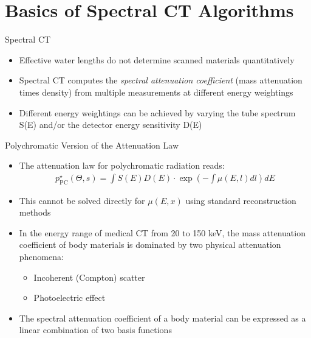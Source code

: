 \section{Basics of Spectral CT Algorithms}

\begin{frame} [c]{Spectral CT}
    \begin{itemize}
        \setlength\itemsep{0.4cm}
        \item Effective water lengths do not determine scanned materials quantitatively
        \item Spectral CT computes the \textit{spectral attenuation coefficient} (mass attenuation times density) from multiple measurements at different energy weightings
        \item Different energy weightings can be achieved by varying the tube spectrum S(E) and/or the detector energy sensitivity D(E)
    \end{itemize}
\end{frame}

\begin{frame}[c]{Polychromatic Version of the Attenuation Law}
    \begin{itemize}
        \item The attenuation law for polychromatic radiation reads:
              \begin{eqnarray*}
                  p^{\star}_{\text{PC}}(\Theta,s) = \int S(E)D(E) \cdot \exp\left(-\int \mu(E, l)dl\right)dE
              \end{eqnarray*}
        \item This cannot be solved directly for $\mu(E,x)$ using standard reconstruction methods
        \item In the energy range of medical CT from 20 to 150 keV, the mass attenuation coefficient of body materials is dominated by two physical attenuation phenomena:
              \begin{itemize}
                  \item Incoherent (Compton) scatter
                  \item Photoelectric effect
              \end{itemize}
        \item The spectral attenuation coefficient of a body material can be expressed as a linear combination of two basis functions
    \end{itemize}
\end{frame}

